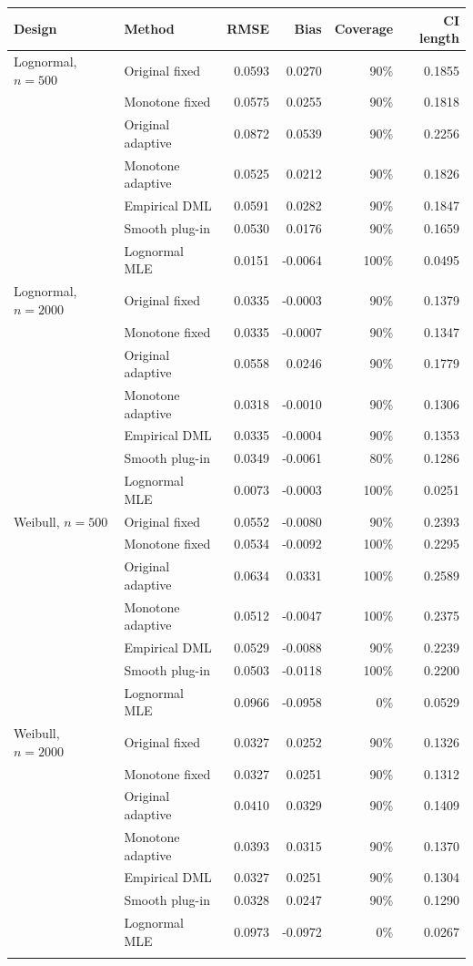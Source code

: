 \begin{tabular}{llrrrr}
\toprule
Design & Method & RMSE & Bias & Coverage & CI length \\
\midrule
Lognormal, $n=500$ & Original fixed & 0.0593 & 0.0270 & 90\% & 0.1855 \\
 & Monotone fixed & 0.0575 & 0.0255 & 90\% & 0.1818 \\
 & Original adaptive & 0.0872 & 0.0539 & 90\% & 0.2256 \\
 & Monotone adaptive & 0.0525 & 0.0212 & 90\% & 0.1826 \\
 & Empirical DML & 0.0591 & 0.0282 & 90\% & 0.1847 \\
 & Smooth plug-in & 0.0530 & 0.0176 & 90\% & 0.1659 \\
 & Lognormal MLE & 0.0151 & -0.0064 & 100\% & 0.0495 \\
\addlinespace
Lognormal, $n=2000$ & Original fixed & 0.0335 & -0.0003 & 90\% & 0.1379 \\
 & Monotone fixed & 0.0335 & -0.0007 & 90\% & 0.1347 \\
 & Original adaptive & 0.0558 & 0.0246 & 90\% & 0.1779 \\
 & Monotone adaptive & 0.0318 & -0.0010 & 90\% & 0.1306 \\
 & Empirical DML & 0.0335 & -0.0004 & 90\% & 0.1353 \\
 & Smooth plug-in & 0.0349 & -0.0061 & 80\% & 0.1286 \\
 & Lognormal MLE & 0.0073 & -0.0003 & 100\% & 0.0251 \\
\addlinespace
Weibull, $n=500$ & Original fixed & 0.0552 & -0.0080 & 90\% & 0.2393 \\
 & Monotone fixed & 0.0534 & -0.0092 & 100\% & 0.2295 \\
 & Original adaptive & 0.0634 & 0.0331 & 100\% & 0.2589 \\
 & Monotone adaptive & 0.0512 & -0.0047 & 100\% & 0.2375 \\
 & Empirical DML & 0.0529 & -0.0088 & 90\% & 0.2239 \\
 & Smooth plug-in & 0.0503 & -0.0118 & 100\% & 0.2200 \\
 & Lognormal MLE & 0.0966 & -0.0958 & 0\% & 0.0529 \\
\addlinespace
Weibull, $n=2000$ & Original fixed & 0.0327 & 0.0252 & 90\% & 0.1326 \\
 & Monotone fixed & 0.0327 & 0.0251 & 90\% & 0.1312 \\
 & Original adaptive & 0.0410 & 0.0329 & 90\% & 0.1409 \\
 & Monotone adaptive & 0.0393 & 0.0315 & 90\% & 0.1370 \\
 & Empirical DML & 0.0327 & 0.0251 & 90\% & 0.1304 \\
 & Smooth plug-in & 0.0328 & 0.0247 & 90\% & 0.1290 \\
 & Lognormal MLE & 0.0973 & -0.0972 & 0\% & 0.0267 \\
\addlinespace
\bottomrule
\end{tabular}
